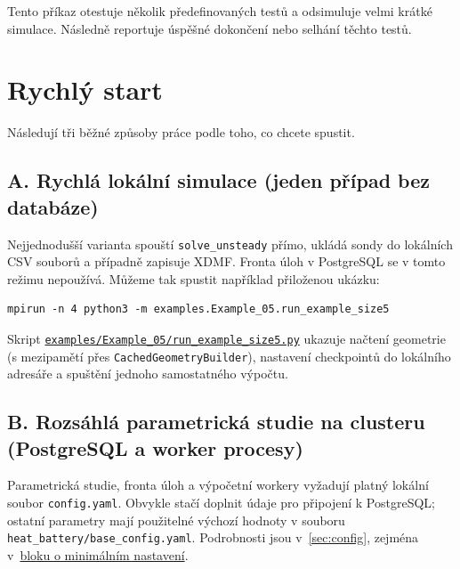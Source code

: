 \documentclass[a4paper,11pt]{article}
\newcommand{\GitHubExFiveDirURL}{https://github.com/LiborKudela/heat-battery/tree/master/examples/Example_05}
\newcommand{\GitHubExFiveRunSize}{\href{\GitHubExFiveDirURL}{\texttt{examples/Example\_05/run\_example\_size5.py}}}
\begin{document}
Tento příkaz otestuje několik předefinovaných testů a
odsimuluje velmi krátké simulace. Následně reportuje úspěšné dokončení nebo 
selhání těchto testů.

\section{Rychlý start}\label{sec:start}

Následují tři běžné způsoby práce podle toho, co chcete spustit.

\subsection*{A. Rychlá lokální simulace (jeden případ bez databáze)}

Nejjednodušší varianta spouští \texttt{solve\_unsteady} přímo, ukládá sondy
do lokálních CSV souborů a případně zapisuje XDMF. Fronta úloh v PostgreSQL se
v tomto režimu nepoužívá. Můžeme tak spustit například přiloženou ukázku:

\begin{lstlisting}[style=bash]
mpirun -n 4 python3 -m examples.Example_05.run_example_size5
\end{lstlisting}

Skript \GitHubExFiveRunSize{} ukazuje načtení
geometrie (s mezipamětí přes \texttt{CachedGeometryBuilder}), nastavení
checkpointů do lokálního adresáře a spuštění jednoho samostatného výpočtu.

\subsection*{B. Rozsáhlá parametrická studie na clusteru (PostgreSQL a worker procesy)}

Parametrická studie, fronta úloh a výpočetní workery vyžadují platný lokální
soubor \texttt{config.yaml}. Obvykle stačí doplnit údaje pro připojení
k PostgreSQL; ostatní parametry mají použitelné výchozí hodnoty v souboru
\texttt{heat\_battery/base\_config.yaml}. Podrobnosti jsou v~\autoref{sec:config},
zejména v~\hyperref[sec:config-minimal]{bloku o minimálním nastavení}.
\end{document}
